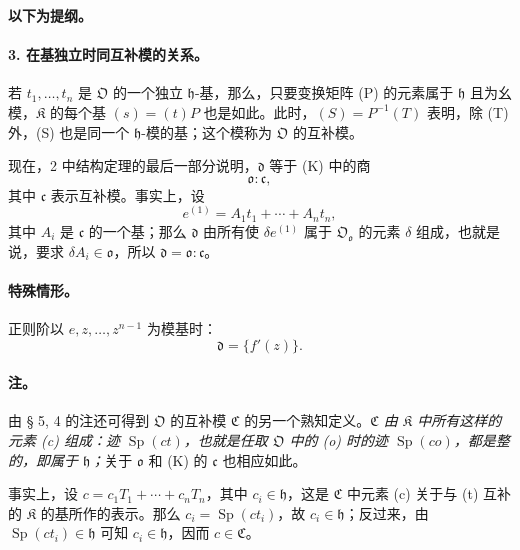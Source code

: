 \documentclass[11pt]{article}
\begin{document}
\begin{center}
\textbf{以下为提纲。}
\end{center}

\paragraph{3. 在基独立时同互补模的关系。}
若 \(t_1,\ldots,t_n\) 是 \(\mathfrak O\) 的一个独立 \(\mathfrak h\)-基，那么，只要变换矩阵 (P) 的元素属于 \(\mathfrak h\) 且为幺模，\(\mathfrak K\) 的每个基 \((s)=(t)P\) 也是如此。此时，\((S)=P^{-1}(T)\) 表明，除 (T) 外，(S) 也是同一个 \(\mathfrak h\)-模的基；这个模称为 \(\mathfrak O\) 的互补模。

现在，2 中结构定理的最后一部分说明，\(\mathfrak d\) 等于 (K) 中的商
\[
\mathfrak o:\mathfrak c,
\]
其中 \(\mathfrak c\) 表示互补模。事实上，设
\[
e^{(1)}=A_1t_1+\cdots+A_nt_n,
\]
其中 \(A_i\) 是 \(\mathfrak c\) 的一个基；那么 \(\mathfrak d\) 由所有使 \(\delta e^{(1)}\) 属于 \(\mathfrak O_{\mathfrak o}\) 的元素 \(\delta\) 组成，也就是说，要求 \(\delta A_i\in\mathfrak o\)，所以 \(\mathfrak d=\mathfrak o:\mathfrak c\)。

\paragraph{特殊情形。}
正则阶以 \(e,z,\ldots,z^{n-1}\) 为模基时：
\[
\mathfrak d=\{f'(z)\}.
\]

\paragraph{注。}
由 § 5, 4 的注还可得到 \(\mathfrak O\) 的互补模 \(\mathfrak C\) 的另一个熟知定义。\emph{\(\mathfrak C\) 由 \(\mathfrak K\) 中所有这样的元素 (c) 组成：迹 \(\operatorname{Sp}(ct)\)，也就是任取 \(\mathfrak O\) 中的 (o) 时的迹 \(\operatorname{Sp}(co)\)，都是整的，即属于 \(\mathfrak h\)；}关于 \(\mathfrak o\) 和 (K) 的 \(\mathfrak c\) 也相应如此。

事实上，设 \(c=c_1T_1+\cdots+c_nT_n\)，其中 \(c_i\in\mathfrak h\)，这是 \(\mathfrak C\) 中元素 (c) 关于与 (t) 互补的 \(\mathfrak K\) 的基所作的表示。那么 \(c_i=\operatorname{Sp}(ct_i)\)，故 \(c_i\in\mathfrak h\)；反过来，由 \(\operatorname{Sp}(ct_i)\in\mathfrak h\) 可知 \(c_i\in\mathfrak h\)，因而 \(c\in\mathfrak C\)。
\end{document}
